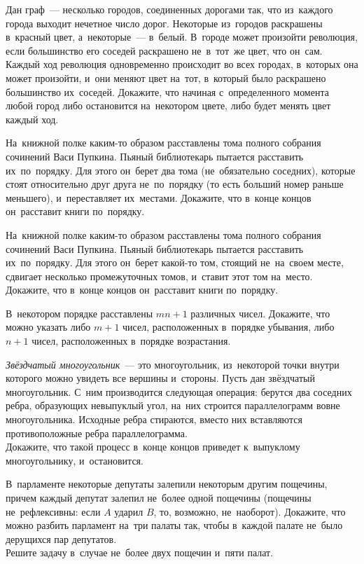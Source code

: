 \begin{problems}
\item
Дан граф~--- несколько городов, соединенных дорогами так, что из~каждого города
выходит нечетное число дорог.
Некоторые из~городов раскрашены в~красный цвет, а~некоторые~--- в~белый.
В~городе может произойти революция, если большинство его соседей раскрашено
не~в~тот~же цвет, что он~сам.
Каждый ход революция одновременно происходит во всех городах, в~которых она
может произойти, и~они меняют цвет на~тот, в~который было раскрашено
большинство их~соседей.
Докажите, что начиная с~определенного момента любой город либо остановится
на~некотором цвете, либо будет менять цвет каждый ход.

\item
На~книжной полке каким-то образом расставлены тома полного собрания сочинений
Васи Пупкина.
Пьяный библиотекарь пытается расставить их~по~порядку.
Для этого он~берет два тома (не~обязательно соседних), которые стоят
относительно друг друга не~по~порядку (то есть больший номер раньше меньшего),
и~переставляет их~местами.
Докажите, что в~конце концов он~расставит книги по~порядку.

\item
На~книжной полке каким-то образом расставлены тома полного собрания сочинений
Васи Пупкина.
Пьяный библиотекарь пытается расставить их~по~порядку.
Для этого он~берет какой-то том, стоящий не~на~своем месте, сдвигает несколько
промежуточных томов, и~ставит этот том на~место.
Докажите, что в~конце концов он~расставит книги по~порядку.

\item
В~некотором порядке расставлены $m n + 1$ различных чисел.
Докажите, что можно указать либо $m + 1$ чисел, расположенных в~порядке
убывания, либо $n + 1$ чисел, расположенных в~порядке возрастания.

\item
\emph{Звёздчатый многоугольник}~--- это многоугольник, из~некоторой точки
внутри которого можно увидеть все вершины и~стороны.
Пусть дан звёздчатый многоугольник.
С~ним производится следующая операция:
берутся два соседних ребра, образующих невыпуклый угол, на~них строится
параллелограмм вовне многоугольника.
Исходные ребра стираются, вместо них вставляются противоположные ребра
параллелограмма.
\\
Докажите, что такой процесс в~конце концов приведет к~выпуклому многоугольнику,
и~остановится.

\item
\sbp
В~парламенте некоторые депутаты залепили некоторым другим пощечины, причем
каждый депутат залепил не~более одной пощечины
(пощечины не~рефлексивны: если $A$ ударил $B$, то, возможно, не~наоборот).
Докажите, что можно разбить парламент на~три палаты так, чтобы в~каждой палате
не~было дерущихся пар депутатов.
\\
\sbp
Решите задачу в~случае не~более двух пощечин и~пяти палат.

\end{problems}

